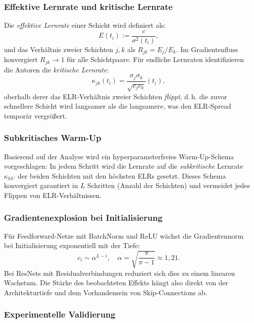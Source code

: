 \documentclass[a4paper,12pt]{article}
\begin{document}
\subsubsection*{Effektive Lernrate und kritische Lernrate}

Die \emph{effektive Lernrate} einer Schicht wird definiert als:
\[
E(t_i) := \frac{c}{\sigma^2(t_i)},
\]
und das Verhältnis zweier Schichten $j, k$ als $R_{jk} = E_j / E_k$. Im Gradientenfluss konvergiert $R_{jk} \to 1$ für alle Schichtpaare. Für endliche Lernraten identifizieren die Autoren die \emph{kritische Lernrate}:
\[
\kappa_{jk}(t_i) = \frac{\sigma_j \sigma_k}{\sqrt{c_j c_k}}(t_i),
\]
oberhalb derer das ELR-Verhältnis zweier Schichten \emph{flippt}, d.\,h. die zuvor schnellere Schicht wird langsamer als die langsamere, was den ELR-Spread temporär vergrößert.

\subsubsection*{Subkritisches Warm-Up}

Basierend auf der Analyse wird ein hyperparameterfreies Warm-Up-Schema vorgeschlagen: In jedem Schritt wird die Lernrate auf die \emph{subkritische} Lernrate $\kappa_{hh'}$ der beiden Schichten mit den höchsten ELRs gesetzt. Dieses Schema konvergiert garantiert in $L$ Schritten (Anzahl der Schichten) und vermeidet jedes Flippen von ELR-Verhältnissen.

\subsubsection*{Gradientenexplosion bei Initialisierung}

Für Feedforward-Netze mit BatchNorm und ReLU wächst die Gradientennorm bei Initialisierung exponentiell mit der Tiefe:
\[
c_i \sim \alpha^{L-i}, \quad \alpha = \sqrt{\frac{\pi}{\pi - 1}} \approx 1{,}21.
\]
Bei ResNets mit Residualverbindungen reduziert sich dies zu einem linearen Wachstum. Die Stärke des beobachteten Effekts hängt also direkt von der Architekturtiefe und dem Vorhandensein von Skip-Connections ab.

\subsubsection*{Experimentelle Validierung}
\end{document}
